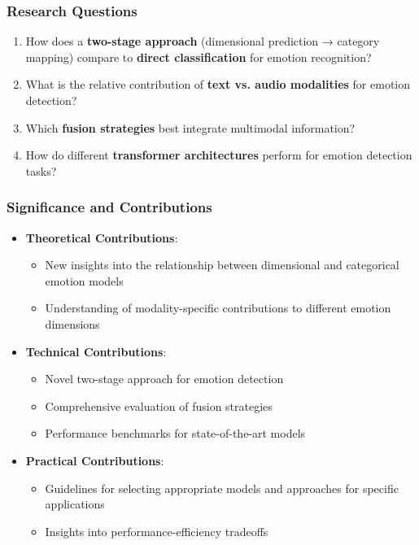 \documentclass{beamer}
\begin{document}
\begin{frame}
\frametitle{Research Questions}
\begin{enumerate}
    \item How does a \textbf{two-stage approach} (dimensional prediction → category mapping) compare to \textbf{direct classification} for emotion recognition?
    \item What is the relative contribution of \textbf{text vs. audio modalities} for emotion detection?
    \item Which \textbf{fusion strategies} best integrate multimodal information?
    \item How do different \textbf{transformer architectures} perform for emotion detection tasks?
\end{enumerate}
\end{frame}

\begin{frame}
\frametitle{Significance and Contributions}
\begin{itemize}
    \item \textbf{Theoretical Contributions}:
    \begin{itemize}
        \item New insights into the relationship between dimensional and categorical emotion models
        \item Understanding of modality-specific contributions to different emotion dimensions
    \end{itemize}
    \item \textbf{Technical Contributions}:
    \begin{itemize}
        \item Novel two-stage approach for emotion detection
        \item Comprehensive evaluation of fusion strategies
        \item Performance benchmarks for state-of-the-art models
    \end{itemize}
    \item \textbf{Practical Contributions}:
    \begin{itemize}
        \item Guidelines for selecting appropriate models and approaches for specific applications
        \item Insights into performance-efficiency tradeoffs
    \end{itemize}
\end{itemize}
\end{frame}
\end{document}
